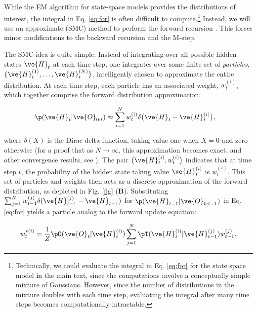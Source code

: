 \documentclass{article}
\begin{document}
While the EM algorithm for state-space models provides the distributions of interest, the integral in Eq. \ref{eq:for} is often difficult to compute.\footnote{Technically, we could evaluate the integral in Eq. \ref{eq:for} for the state space model in the main text, since the computations involve a conceptually simple mixture of Gaussians.  However, since the number of distributions in the mixture doubles with each time step, evaluating the integral after many time steps becomes computationally intractable.}  Instead, we will use an approximate (SMC) method to perform the forward recursion  \cite{DoucetGordon01, KlaasDoucet05}.  This forces minor modifications to the backward recursion and the M-step.

The SMC idea is quite simple.  Instead of integrating over all possible hidden states $\ve{H}_t$ at each time step, one integrates over some finite set of \emph{particles}, $\{\ve{H}_t^{(1)}, \ldots, \ve{H}_t^{(N)}\}$, intelligently chosen to approximate the entire distribution.  At each time step, each particle has an associated weight, $w_t^{(i)}$, which together comprise the forward distribution approximation:

\begin{align} \label{eq:for_approx}
\p(\ve{H}_t | \ve{O}_{0:t}) &\approx  \sum_{i=1}^N w_t^{(i)} \delta\big(\ve{H}_t - \ve{H}_t^{(i)}\big),
\end{align}

\noindent where $\delta(X)$ is the Dirac delta function, taking value one when $X=0$ and zero otherwise (for a proof that as $N \rightarrow \infty$, this approximation becomes exact, and other convergence results, see  \cite{DoucetGordon01}).  The pair $\big(\ve{H}_t^{(i)} ,w_t^{(i)}\big)$ indicates that at time step $t$, the probability of the hidden state taking value $\ve{H}_t^{(i)}$ is $w_t^{(i)}$.  This set of particles and weights then acts as a discrete approximation of the forward distribution, as depicted in Fig. \ref{fig} (\textbf{B}). Substituting $\sum_{j=1}^N w_{t-1}^{(j)} \delta(\ve{H}_{t-1}^{(j)} - \ve{H}_{t-1})$ for $\p(\ve{H}_{t-1} | \ve{O}_{0:t-1})$ in Eq. \ref{eq:for} yields a particle analog to the forward update equation:


\begin{align}\label{eq:MPF}
w_t^{\ast (i)} = \frac{1}{Z} \pO(\ve{O}_t | \ve{H}_t^{(i)}) %
\sum_{j=1}^N \pT(\ve{H}_t^{(i)} | \ve{H}_{t-1}^{(j)}) w_{t-1}^{(j)}.
\end{align} %
\end{document}
